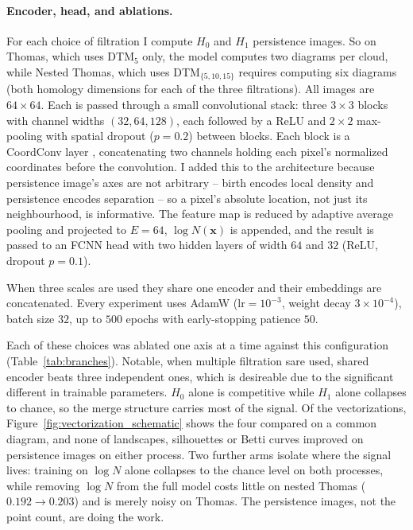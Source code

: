 \documentclass[11pt,a4paper]{article}
\newcommand{\pc}{\mathbf{x}}
\begin{document}
\paragraph{Encoder, head, and ablations.} For each choice of filtration I compute $H_0$ and $H_1$
persistence images. So on Thomas, which uses DTM$_5$ only, the model computes two diagrams per cloud, while Nested Thomas, which uses DTM$_{\{5,10,15\}}$ requires computing six diagrams (both homology dimensions for each of the three filtrations). All images are $64\times64$. Each is passed through a small convolutional stack: three $3\times3$ blocks with channel widths $(32,64,128)$, each followed by a ReLU and $2\times2$ max-pooling with spatial dropout ($p=0.2$) between blocks. Each block is a CoordConv layer \citep{liu2018coordconv}, concatenating two channels
holding each pixel's normalized coordinates before the convolution. I added this to the architecture because persistence image's axes are not arbitrary -- birth encodes local density and
persistence encodes separation -- so a pixel's absolute location, not just its
neighbourhood, is informative.  The feature map is reduced by adaptive average
pooling and projected to $E=64$, $\log N(\pc)$ is appended, and the result is
passed to an FCNN head with two hidden layers of width $64$ and $32$ (ReLU,
dropout $p=0.1$). 

When three scales are used they share one encoder and their
embeddings are concatenated. Every experiment uses AdamW ($\text{lr}=10^{-3}$,
weight decay $3\times10^{-4}$), batch size $32$, up to $500$ epochs with
early-stopping patience $50$.

Each of these choices was ablated one axis at a time against this configuration
(Table~\ref{tab:branches}). Notable, when multiple filtration sare used, shared encoder beats three independent ones, which is desireable due to the significant different in trainable parameters. $H_0$
alone is competitive while $H_1$ alone collapses to chance, so the merge
structure carries most of the signal. Of the vectorizations,
Figure~\ref{fig:vectorization_schematic} shows the four compared on a common
diagram, and none of landscapes, silhouettes or Betti curves improved on
persistence images on either process. Two further arms isolate where the signal
lives: training on $\log N$ alone collapses to the chance level on both
processes, while removing $\log N$ from the full model costs little on nested
Thomas ($0.192\to0.203$) and is merely noisy on Thomas. The persistence images,
not the point count, are doing the work.
\end{document}
